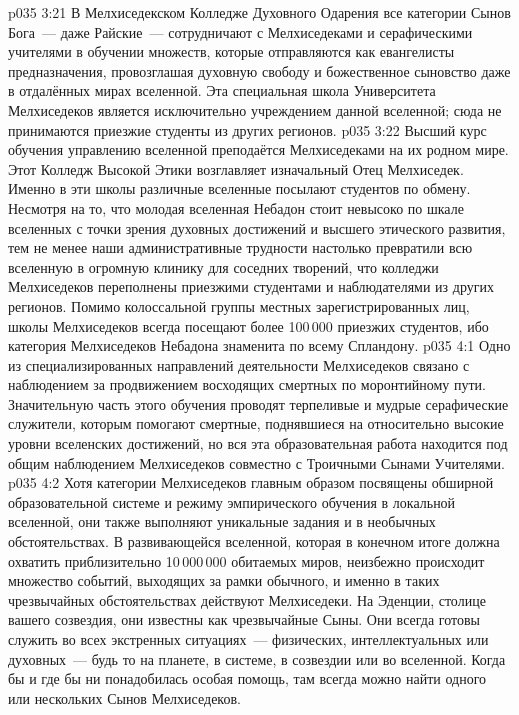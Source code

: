 \vs p035 3:21 В Мелхиседекском Колледже Духовного Одарения все категории Сынов Бога~--- даже Райские~--- сотрудничают с Мелхиседеками и серафическими учителями в обучении множеств, которые отправляются как евангелисты предназначения, провозглашая духовную свободу и божественное сыновство даже в отдалённых мирах вселенной. Эта специальная школа Университета Мелхиседеков является исключительно учреждением данной вселенной; сюда не принимаются приезжие студенты из других регионов.
\vs p035 3:22 Высший курс обучения управлению вселенной преподаётся Мелхиседеками на их родном мире. Этот Колледж Высокой Этики возглавляет изначальный Отец Мелхиседек. Именно в эти школы различные вселенные посылают студентов по обмену. Несмотря на то, что молодая вселенная Небадон стоит невысоко по шкале вселенных с точки зрения духовных достижений и высшего этического развития, тем не менее наши административные трудности настолько превратили всю вселенную в огромную клинику для соседних творений, что колледжи Мелхиседеков переполнены приезжими студентами и наблюдателями из других регионов. Помимо колоссальной группы местных зарегистрированных лиц, школы Мелхиседеков всегда посещают более 100\,000 приезжих студентов, ибо категория Мелхиседеков Небадона знаменита по всему Спландону.
\vs p035 4:1 Одно из специализированных направлений деятельности Мелхиседеков связано с наблюдением за продвижением восходящих смертных по моронтийному пути. Значительную часть этого обучения проводят терпеливые и мудрые серафические служители, которым помогают смертные, поднявшиеся на относительно высокие уровни вселенских достижений, но вся эта образовательная работа находится под общим наблюдением Мелхиседеков совместно с Троичными Сынами Учителями.
\vs p035 4:2 \pc Хотя категории Мелхиседеков главным образом посвящены обширной образовательной системе и режиму эмпирического обучения в локальной вселенной, они также выполняют уникальные задания и в необычных обстоятельствах. В развивающейся вселенной, которая в конечном итоге должна охватить приблизительно 10\,000\,000 обитаемых миров, неизбежно происходит множество событий, выходящих за рамки обычного, и именно в таких чрезвычайных обстоятельствах действуют Мелхиседеки. На Эденции, столице вашего созвездия, они известны как чрезвычайные Сыны. Они всегда готовы служить во всех экстренных ситуациях~--- физических, интеллектуальных или духовных~--- будь то на планете, в системе, в созвездии или во вселенной. Когда бы и где бы ни понадобилась особая помощь, там всегда можно найти одного или нескольких Сынов Мелхиседеков.
